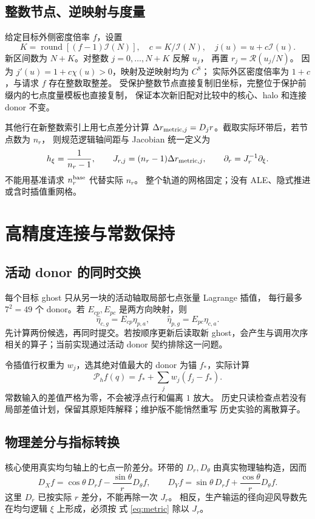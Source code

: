 \documentclass[UTF8,fontset=fandol,11pt,a4paper]{ctexart}
\begin{document}
\subsection{整数节点、逆映射与度量}
给定目标外侧密度倍率 $f$，设置
\begin{equation}
 K=\operatorname{round}[(f-1)\mathcal I(N)],\quad
 c=K/\mathcal I(N),\quad
 j(u)=u+c\mathcal I(u).
 \label{eq:indexmap}
\end{equation}
新区间数为 $N+K$。对整数 $j=0,\ldots,N+K$ 反解 $u_j$，
再置 $r_j=\mathcal R(u_j/N)$。
因为 $j'(u)=1+c\chi(u)>0$，映射及逆映射均为 $C^8$；
实际外区密度倍率为 $1+c$，与请求 $f$ 存在整数取整差。
受保护整数节点直接复制旧坐标，完整位于保护前缀内的七点度量模板也直接复制，
保证本次新旧配对比较中的核心、halo 和连接 donor 不变。

其他行在新整数索引上用七点差分计算
$\Delta r_{{\rm metric},j}=D_jr$。截取实际环带后，若节点数为 $n_r$，
则规范逻辑轴间距与 Jacobian 统一定义为
\begin{equation}
 h_\xi=\frac1{n_r-1},\qquad
 J_{r,j}=(n_r-1)\Delta r_{{\rm metric},j},\qquad
 \partial_r=J_r^{-1}\partial_\xi.
 \label{eq:metric}
\end{equation}
不能用基准请求 $n_r^{\rm base}$ 代替实际 $n_r$。
整个轨道的网格固定；没有 ALE、隐式推进或含时插值重网格。

\clearpage
\section{高精度连接与常数保持}
\subsection{活动 donor 的同时交换}
每个目标 ghost 只从另一块的活动轴取局部七点张量 Lagrange 插值，
每行最多 $7^2=49$ 个 donor。若 $E_{cp},E_{pc}$ 是两方向映射，则
\[
 \widehat\eta_{c,g}=E_{cp}\eta_{p,a},\qquad
 \widehat\eta_{p,g}=E_{pc}\eta_{c,a}.
\]
先计算两份候选，再同时提交。若按顺序更新后读取新 ghost，会产生与调用次序
相关的算子；当前实现通过活动 donor 契约排除这一问题。

令插值行权重为 $w_j$，选其绝对值最大的 donor 为锚 $f_*$，实际计算
\begin{equation}
 \mathcal P_hf(q)=f_*+\sum_jw_j(f_j-f_*).
 \label{eq:constant-interpolation}
\end{equation}
常数输入的差值严格为零，不会被浮点行和偏离 $1$ 放大。
历史只读检查点若没有局部差值计划，保留其原矩阵解释；维护版不能悄然重写
历史实验的离散算子。

\subsection{物理差分与指标转换}
核心使用真实均匀轴上的七点一阶差分。环带的
$D_r,D_\theta$ 由真实物理轴构造，因而
\begin{equation}
 D_Xf=\cos\theta\,D_rf-\frac{\sin\theta}{r}D_\theta f,\qquad
 D_Yf=\sin\theta\,D_rf+\frac{\cos\theta}{r}D_\theta f.
 \label{eq:physical-difference}
\end{equation}
这里 $D_r$ 已按实际 $r$ 差分，不能再除一次 $J_r$。
相反，生产输运的径向迎风导数先在均匀逻辑 $\xi$ 上形成，必须按
式 \eqref{eq:metric} 除以 $J_r$。
\end{document}

